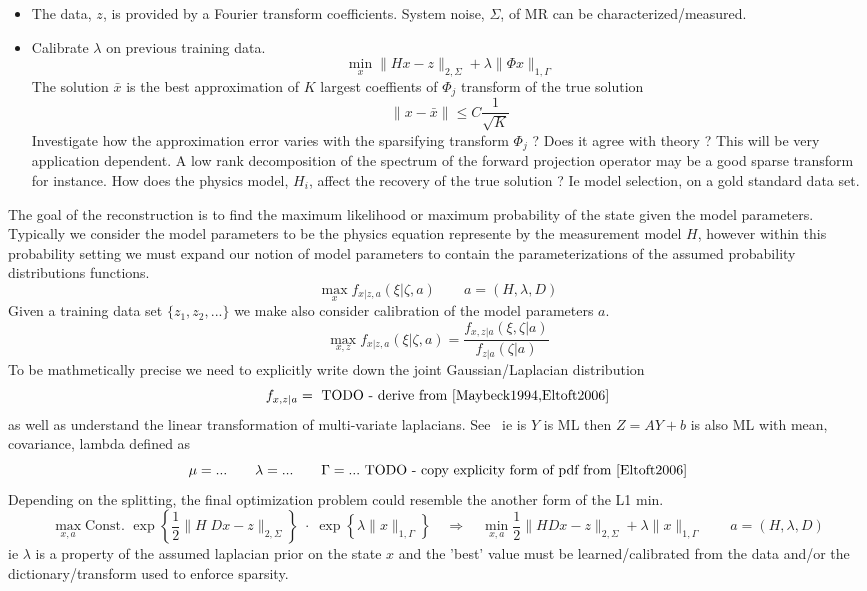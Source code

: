 \documentclass[10pt]{amsart}
\begin{document}
\begin{itemize}
  \item  The data, $z$, is provided by a Fourier transform coefficients.
System noise, $\Sigma$, of MR can be characterized/measured.
\item Calibrate $\lambda$ on previous training data.
\[
   \min_{x} \|Hx -z \|_{2,\Sigma} + \lambda \| \Phi x\|_{1,\Gamma}
\]
The solution $\bar{x}$ is the best approximation of $K$ largest coeffients
of $\Phi_j$ transform of the true solution 
\[
             \| x - \bar{x}\| \leq C  \frac{1}{\sqrt{K}}
\]
Investigate how the approximation error varies with the sparsifying transform
$\Phi_j$ ? Does it agree with theory ? 
This will be very application dependent. A low rank decomposition
of the spectrum of the forward projection operator may be a good sparse transform
for instance. How does the physics model, $H_i$, affect the recovery
of the true solution ? Ie model selection, on a gold standard data set.
\end{itemize}

The goal of the reconstruction is to find the maximum likelihood 
or maximum probability of the state given the model parameters.
Typically we consider the model parameters to be the physics equation
represente by the measurement model $H$, however within this probability
setting we must expand our notion of model parameters to contain
the parameterizations of the assumed probability distributions functions.
\[
   \max_x f_{x|z,a}(\xi| \zeta, a)  \qquad a = \left(H,\lambda, D\right)
\]
Given a training data set $\{z_1, z_2,...\}$ we make also consider
calibration of the model parameters $a$.
\[
   \max_{x,z} f_{x|z,a}(\xi| \zeta, a)   = \frac{f_{x,z|a}(\xi, \zeta| a)}
                                                {f_{z|a}( \zeta| a)}
\]
To be mathmetically precise we need to explicitly write down the joint
Gaussian/Laplacian distribution 
\[
   f_{x,z|a} = \text{ TODO - derive from \cite{Maybeck1994,Eltoft2006}}
\]
as well as understand the linear transformation of multi-variate laplacians.
See~\cite{Eltoft2006} ie is $Y$ is ML then $Z = AY +b$ is also ML with mean,
covariance, lambda defined as
\[
   \mu     = ...  
   \qquad 
   \lambda = ... 
   \qquad 
   \Gamma = ... \text{ TODO - copy explicity form of pdf from \cite{Eltoft2006}}
\]
Depending on the splitting,  the final optimization problem could resemble
the another form of the L1 min.
          \[
            \max_{x,a}  \text{Const. } 
          \exp \left\{ \frac{1}{2} \|H\; Dx -z\|_{2,\Sigma} \right\} 
               \; \cdot \;
          \exp  \left\{ \lambda  \|x\|_{1,\Gamma}\right\} 
               \quad \Rightarrow \quad
                  \min_{x,a}  \frac{1}{2} \|H Dx -z\|_{2,\Sigma} +  \lambda  \|x\|_{1,\Gamma} 
           \qquad a = \left(H,\lambda, D\right)
          \]
ie $\lambda$ is a property of the assumed laplacian prior on the state $x$
and the 'best' value must be learned/calibrated from the data and/or the
dictionary/transform used to enforce sparsity.
\end{document}
